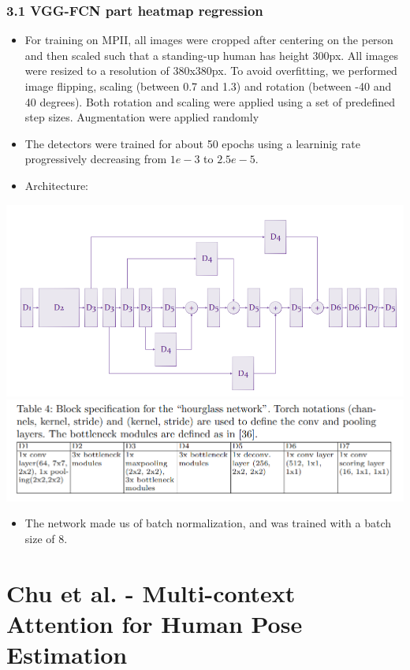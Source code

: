 \documentclass{report}
\begin{document}
\subsubsection*{3.1 VGG-FCN part heatmap regression}
\begin{itemize}
    \item For training on MPII, all images were cropped after centering on the person and then scaled such that a standing-up human has height 300px. All images were resized to a resolution of 380x380px. To avoid overfitting, we performed image flipping, scaling (between 0.7 and 1.3) and rotation (between -40 and 40 degrees). Both rotation and scaling were applied using a set of predefined step sizes. Augmentation were applied randomly
    \item The detectors were trained for about 50 epochs using a learninig rate progressively decreasing from $1e-3$ to $2.5 e - 5$.
    \item Architecture:
\end{itemize}
\begin{center}
    \includegraphics[height = 6 cm]{entities/bulat_1.PNG}
    \includegraphics[height = 4 cm]{entities/bulat_2.PNG}
\end{center}
\begin{itemize}
    \item The network made us of batch normalization, and was trained with a batch size of 8.
\end{itemize}
\section*{Chu et al. - Multi-context Attention for Human Pose Estimation}
\end{document}
